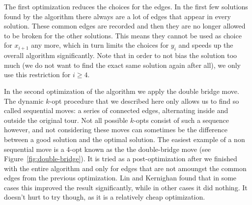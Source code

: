 \documentclass[titlepage, 12pt]{article}
\begin{document}
    The first optimization reduces the choices for the edges. In the first few solutions found by
    the algorithm there always are a lot of edges that appear in every solution. These common edges
    are recorded and then they are no longer allowed to be broken for the other solutions. This
    means they cannot be used as choice for $x_{i+1}$ any more, which in turn limits the choices for
    $y_i$ and speeds up the overall algorithm significantly. Note that in order to not bias the
    solution too much (we do not want to find the exact same solution again after all), we only use
    this restriction for $i \geq 4$.

    In the second optimization of the algorithm we apply the double bridge move.
    The dynamic $k$-opt procedure that we described here only allows us to find so called sequential
    moves: a series of connected edges, alternating inside and outside the original tour. Not all
    possible $k$-opts consist of such a sequence however, and not considering these moves can
    sometimes be the difference between a good solution and the optimal solution. The easiest
    example of a non sequential move is a 4-opt known as the the double-bridge move (see
    Figure~\ref{fig:double-bridge}).
    It is tried as a post-optimization after we finished with the entire algorithm and only for
    edges that are not amoungst the common edges from the previous optimization. Lin and Kernighan
    found that in some cases this improved the result significantly, while in other cases it did
    nothing. It doesn't hurt to try though, as it is a relatively cheap optimization.

\end{document}
